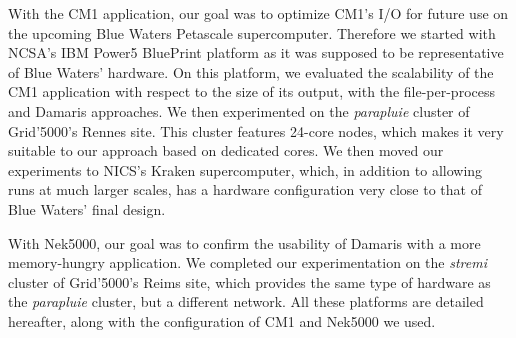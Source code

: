 With the CM1 application, our goal was to optimize CM1's I/O for future use on the 
upcoming Blue Waters Petascale supercomputer. Therefore we started with NCSA's IBM Power5 BluePrint 
platform as it was supposed to be representative of Blue Waters' hardware.
On this platform, we evaluated the scalability of the CM1 application with respect to the size of its output, with the file-per-process and 
Damaris approaches. We then experimented on the \emph{parapluie} cluster of Grid'5000's Rennes site.
This cluster features 24-core nodes, which makes it very suitable to our approach based on dedicated cores. 
We then moved our experiments to NICS's Kraken supercomputer, which, in addition to allowing runs at much larger scales, 
has a hardware configuration very close to that of Blue Waters' final design.

With Nek5000, our goal was to confirm the usability of Damaris with a more memory-hungry application.
We completed our experimentation on the \emph{stremi} cluster of Grid'5000's Reims site, which provides the same type
of hardware as the \emph{parapluie} cluster, but a different network.
All these platforms are detailed hereafter, along with the configuration of CM1 and Nek5000 we used.

